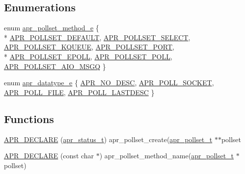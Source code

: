 \subsection*{Enumerations}
\begin{DoxyCompactItemize}
\item 
enum \hyperlink{group__apr__poll_gabe6f1238ea45e9425fa052e2788e4a29}{apr\+\_\+pollset\+\_\+method\+\_\+e} \{ \\*
\hyperlink{group__apr__poll_ggabe6f1238ea45e9425fa052e2788e4a29ae68b155914b79d4a58519675dfc24d94}{A\+P\+R\+\_\+\+P\+O\+L\+L\+S\+E\+T\+\_\+\+D\+E\+F\+A\+U\+LT}, 
\hyperlink{group__apr__poll_ggabe6f1238ea45e9425fa052e2788e4a29aa6613bebee1abb348da2a153f91c738e}{A\+P\+R\+\_\+\+P\+O\+L\+L\+S\+E\+T\+\_\+\+S\+E\+L\+E\+CT}, 
\hyperlink{group__apr__poll_ggabe6f1238ea45e9425fa052e2788e4a29a2722387d6523f8f02cec7c31a45966d4}{A\+P\+R\+\_\+\+P\+O\+L\+L\+S\+E\+T\+\_\+\+K\+Q\+U\+E\+UE}, 
\hyperlink{group__apr__poll_ggabe6f1238ea45e9425fa052e2788e4a29aec66f6da923595ff0a6fa20f4bc41e46}{A\+P\+R\+\_\+\+P\+O\+L\+L\+S\+E\+T\+\_\+\+P\+O\+RT}, 
\\*
\hyperlink{group__apr__poll_ggabe6f1238ea45e9425fa052e2788e4a29a142ebdcab58ccfabd5d964ff3ab476ab}{A\+P\+R\+\_\+\+P\+O\+L\+L\+S\+E\+T\+\_\+\+E\+P\+O\+LL}, 
\hyperlink{group__apr__poll_ggabe6f1238ea45e9425fa052e2788e4a29aa8c0b4c036644ea4518f8d7c2fd4fe8e}{A\+P\+R\+\_\+\+P\+O\+L\+L\+S\+E\+T\+\_\+\+P\+O\+LL}, 
\hyperlink{group__apr__poll_ggabe6f1238ea45e9425fa052e2788e4a29ace0288893b2db65847536c41c0048e82}{A\+P\+R\+\_\+\+P\+O\+L\+L\+S\+E\+T\+\_\+\+A\+I\+O\+\_\+\+M\+S\+GQ}
 \}
\item 
enum \hyperlink{group__apr__poll_ga0a8549d84c1721788b102a4cc8b4b0f0}{apr\+\_\+datatype\+\_\+e} \{ \hyperlink{group__apr__poll_gga0a8549d84c1721788b102a4cc8b4b0f0aeb85f43492052bf0788d31f6dd85a222}{A\+P\+R\+\_\+\+N\+O\+\_\+\+D\+E\+SC}, 
\hyperlink{group__apr__poll_gga0a8549d84c1721788b102a4cc8b4b0f0a3629c5b3166fde91792f2f913fbd72f0}{A\+P\+R\+\_\+\+P\+O\+L\+L\+\_\+\+S\+O\+C\+K\+ET}, 
\hyperlink{group__apr__poll_gga0a8549d84c1721788b102a4cc8b4b0f0a8351d461bf66b706232962fd02e84202}{A\+P\+R\+\_\+\+P\+O\+L\+L\+\_\+\+F\+I\+LE}, 
\hyperlink{group__apr__poll_gga0a8549d84c1721788b102a4cc8b4b0f0a413b387c7fe1ca7b096d46dfd9942fe5}{A\+P\+R\+\_\+\+P\+O\+L\+L\+\_\+\+L\+A\+S\+T\+D\+E\+SC}
 \}
\end{DoxyCompactItemize}
\subsection*{Functions}
\begin{DoxyCompactItemize}
\item 
\hyperlink{group__apr__poll_gad3f3d7d056f3af6d55a5a7385637c918}{A\+P\+R\+\_\+\+D\+E\+C\+L\+A\+RE} (\hyperlink{group__apr__errno_gaa5105fa83cc322f09382292db8b47593}{apr\+\_\+status\+\_\+t}) apr\+\_\+pollset\+\_\+create(\hyperlink{structapr__pollset__t}{apr\+\_\+pollset\+\_\+t} $\ast$$\ast$pollset
\item 
\hyperlink{group__apr__poll_gaef92b86069b7cf1da2ef15b186ec1552}{A\+P\+R\+\_\+\+D\+E\+C\+L\+A\+RE} (const char $\ast$) apr\+\_\+pollset\+\_\+method\+\_\+name(\hyperlink{structapr__pollset__t}{apr\+\_\+pollset\+\_\+t} $\ast$pollset)
\end{DoxyCompactItemize}
